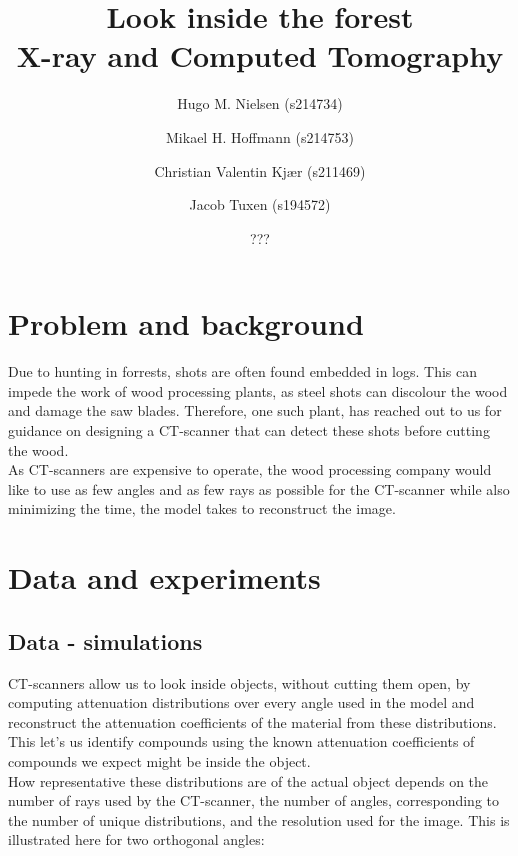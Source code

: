 \documentclass{article}
\title{
    Look inside the forest \\
    \large X-ray and Computed Tomography
}
\author{Hugo M. Nielsen (s214734) \and Mikael H. Hoffmann (s214753) \and Christian Valentin Kjær (s211469) \and Jacob Tuxen (s194572)}
\date{???}
\begin{document}
\maketitle


\section{Problem and background} 
Due to hunting in forrests, shots are often found embedded in logs. This can impede the work of wood processing plants, as steel shots can discolour the wood and damage the saw blades. Therefore, one such plant, has reached out to us for guidance on designing a CT-scanner that can detect these shots before cutting the wood. \\
As CT-scanners are expensive to operate, the wood processing company would like to use as few angles and as few rays as possible for the CT-scanner while also minimizing the time, the model takes to reconstruct the image.


\section{Data and experiments}
\subsection{Data - simulations}
CT-scanners allow us to look inside objects, without cutting them open, by computing attenuation distributions over every angle used in the model and reconstruct the attenuation coefficients of the material from these distributions. This let's us identify compounds using the known attenuation coefficients of compounds we expect might be inside the object. \\ 
How representative these distributions are of the actual object depends on the number of rays used by the CT-scanner, the number of angles, corresponding to the number of unique distributions, and the resolution used for the image. This is illustrated here for two orthogonal angles:
\end{document}

